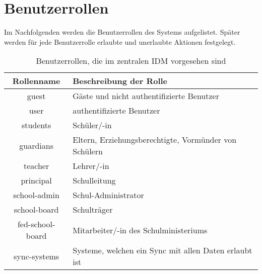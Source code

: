 \section{Benutzerrollen}
Im Nachfolgenden werden die Benutzerrollen des Systems aufgelistet. 
Später werden für jede Benutzerrolle erlaubte und unerlaubte Aktionen festgelegt.


\begin{table}[htb]
	\begin{tabularx}{\textwidth}{|c|X|}
		\hline
\textbf{Rollenname} & \textbf{Beschreibung der Rolle} \\ \hline
guest & Gäste und nicht authentifizierte Benutzer \\ \hline
user & authentifizierte Benutzer \\ \hline
students & Schüler/-in \\ \hline
guardians & Eltern, Erziehungsberechtigte, Vormünder von Schülern \\ \hline
teacher & Lehrer/-in \\ \hline
principal & Schulleitung \\ \hline
school-admin & Schul-Administrator \\ \hline
school-board & Schulträger \\ \hline
fed-school-board & Mitarbeiter/-in des Schulministeriums \\ \hline
sync-systems & Systeme, welchen ein Sync mit allen Daten erlaubt ist \\ \hline

	\end{tabularx}

		\caption{Benutzerrollen, die im zentralen IDM vorgesehen sind}
		\label{tab:intro:roles}
\end{table}